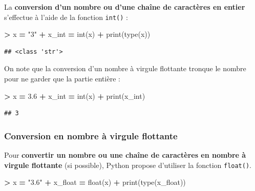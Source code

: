 \documentclass[12pt,]{book}
\newenvironment{Shaded}{\begin{snugshade}}{\end{snugshade}}
\newcommand{\FloatTok}[1]{\textcolor[rgb]{0.00,0.00,0.81}{#1}}
\newcommand{\StringTok}[1]{\textcolor[rgb]{0.31,0.60,0.02}{#1}}
\newcommand{\OperatorTok}[1]{\textcolor[rgb]{0.81,0.36,0.00}{\textbf{#1}}}
\newcommand{\BuiltInTok}[1]{#1}
\newcommand{\NormalTok}[1]{#1}
\numberwithin{equation}{section}
\numberwithin{countremarque}{section}
\begin{document}
La \textbf{conversion d'un nombre ou d'une chaîne de caractères en
entier} s'effectue à l'aide de la fonction \texttt{int()} :

\begin{Shaded}
\begin{Highlighting}[]
\OperatorTok{>}\NormalTok{ x }\OperatorTok{=} \StringTok{"3"}
\OperatorTok{+}\NormalTok{ x_int }\OperatorTok{=} \BuiltInTok{int}\NormalTok{(x)}
\OperatorTok{+} \BuiltInTok{print}\NormalTok{(}\BuiltInTok{type}\NormalTok{(x))}
\end{Highlighting}
\end{Shaded}

\begin{lstlisting}
## <class 'str'>
\end{lstlisting}

On note que la conversion d'un nombre à virgule flottante tronque le
nombre pour ne garder que la partie entière :

\begin{Shaded}
\begin{Highlighting}[]
\OperatorTok{>}\NormalTok{ x }\OperatorTok{=} \FloatTok{3.6}
\OperatorTok{+}\NormalTok{ x_int }\OperatorTok{=} \BuiltInTok{int}\NormalTok{(x)}
\OperatorTok{+} \BuiltInTok{print}\NormalTok{(x_int)}
\end{Highlighting}
\end{Shaded}

\begin{lstlisting}
## 3
\end{lstlisting}

\subsubsection{Conversion en nombre à virgule
flottante}\label{conversion-en-nombre-a-virgule-flottante}

Pour \textbf{convertir un nombre ou une chaîne de caractères en nombre à
virgule flottante} (si possible), Python propose d'utiliser la fonction
\texttt{float()}.

\begin{Shaded}
\begin{Highlighting}[]
\OperatorTok{>}\NormalTok{ x }\OperatorTok{=} \StringTok{"3.6"}
\OperatorTok{+}\NormalTok{ x_float }\OperatorTok{=} \BuiltInTok{float}\NormalTok{(x)}
\OperatorTok{+} \BuiltInTok{print}\NormalTok{(}\BuiltInTok{type}\NormalTok{(x_float))}
\end{Highlighting}
\end{Shaded}
\end{document}
